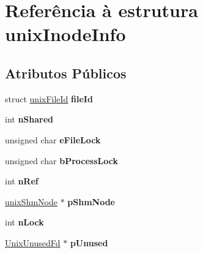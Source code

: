 \hypertarget{structunix_inode_info}{\section{Referência à estrutura unix\-Inode\-Info}
\label{structunix_inode_info}
}
\subsection*{Atributos Públicos}
\begin{DoxyCompactItemize}
\item 
\hypertarget{structunix_inode_info_ae692731d449f4462a921dda9a061faa6}{struct \hyperlink{structunix_file_id}{unix\-File\-Id} {\bfseries file\-Id}}\label{structunix_inode_info_ae692731d449f4462a921dda9a061faa6}

\item 
\hypertarget{structunix_inode_info_a0d7f8dd92964f53e59c8d741dbe00a61}{int {\bfseries n\-Shared}}\label{structunix_inode_info_a0d7f8dd92964f53e59c8d741dbe00a61}

\item 
\hypertarget{structunix_inode_info_a010a765bb3feecb16b650f68fc3a3c1f}{unsigned char {\bfseries e\-File\-Lock}}\label{structunix_inode_info_a010a765bb3feecb16b650f68fc3a3c1f}

\item 
\hypertarget{structunix_inode_info_ade689e4231dd80bb33c86da1e5ed1586}{unsigned char {\bfseries b\-Process\-Lock}}\label{structunix_inode_info_ade689e4231dd80bb33c86da1e5ed1586}

\item 
\hypertarget{structunix_inode_info_a65cbd1fd05ed00f03a252266b04a8221}{int {\bfseries n\-Ref}}\label{structunix_inode_info_a65cbd1fd05ed00f03a252266b04a8221}

\item 
\hypertarget{structunix_inode_info_a302a8b82e27d5b3624ec122bc9c2ed61}{\hyperlink{structunix_shm_node}{unix\-Shm\-Node} $\ast$ {\bfseries p\-Shm\-Node}}\label{structunix_inode_info_a302a8b82e27d5b3624ec122bc9c2ed61}

\item 
\hypertarget{structunix_inode_info_a477f3357a32adbc1a9b05017e535444d}{int {\bfseries n\-Lock}}\label{structunix_inode_info_a477f3357a32adbc1a9b05017e535444d}

\item 
\hypertarget{structunix_inode_info_a0dda9ad35734fa161d1f0b13b671c1c6}{\hyperlink{struct_unix_unused_fd}{Unix\-Unused\-Fd} $\ast$ {\bfseries p\-Unused}}\label{structunix_inode_info_a0dda9ad35734fa161d1f0b13b671c1c6}


\end{DoxyCompactItemize}
